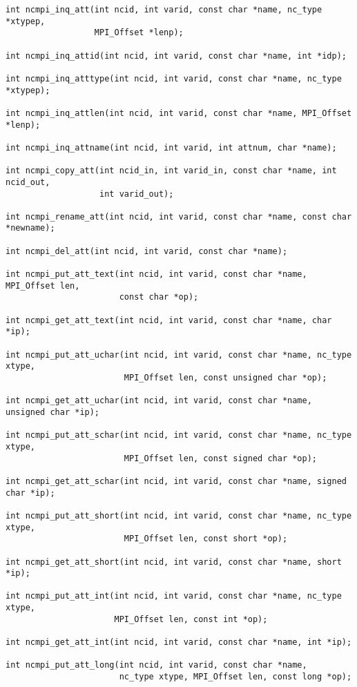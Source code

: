 \begin{verbatim}
int ncmpi_inq_att(int ncid, int varid, const char *name, nc_type *xtypep,
                  MPI_Offset *lenp);

int ncmpi_inq_attid(int ncid, int varid, const char *name, int *idp);

int ncmpi_inq_atttype(int ncid, int varid, const char *name, nc_type *xtypep);

int ncmpi_inq_attlen(int ncid, int varid, const char *name, MPI_Offset *lenp);

int ncmpi_inq_attname(int ncid, int varid, int attnum, char *name);

int ncmpi_copy_att(int ncid_in, int varid_in, const char *name, int ncid_out,
                   int varid_out);

int ncmpi_rename_att(int ncid, int varid, const char *name, const char *newname);

int ncmpi_del_att(int ncid, int varid, const char *name);

int ncmpi_put_att_text(int ncid, int varid, const char *name, MPI_Offset len,
                       const char *op);

int ncmpi_get_att_text(int ncid, int varid, const char *name, char *ip);

int ncmpi_put_att_uchar(int ncid, int varid, const char *name, nc_type xtype,
                        MPI_Offset len, const unsigned char *op);

int ncmpi_get_att_uchar(int ncid, int varid, const char *name, unsigned char *ip);

int ncmpi_put_att_schar(int ncid, int varid, const char *name, nc_type xtype,
                        MPI_Offset len, const signed char *op);

int ncmpi_get_att_schar(int ncid, int varid, const char *name, signed char *ip);

int ncmpi_put_att_short(int ncid, int varid, const char *name, nc_type xtype,
                        MPI_Offset len, const short *op);

int ncmpi_get_att_short(int ncid, int varid, const char *name, short *ip);

int ncmpi_put_att_int(int ncid, int varid, const char *name, nc_type xtype,
                      MPI_Offset len, const int *op);

int ncmpi_get_att_int(int ncid, int varid, const char *name, int *ip);

int ncmpi_put_att_long(int ncid, int varid, const char *name,
                       nc_type xtype, MPI_Offset len, const long *op);


\end{verbatim}
